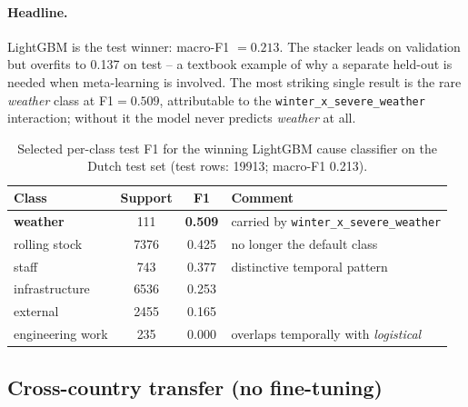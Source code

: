 \paragraph{Headline.} LightGBM is the test winner: macro-F1 $=\num{0.213}$. The stacker leads on validation but overfits to \num{0.137} on test -- a textbook example of why a separate held-out is needed when meta-learning is involved. The most striking single result is the rare \emph{weather} class at F1$=\num{0.509}$, attributable to the \texttt{winter\_x\_severe\_weather} interaction; without it the model never predicts \emph{weather} at all.

\begin{table}[H]
    \centering
    \caption{Selected per-class test F1 for the winning LightGBM cause classifier on the Dutch test set (test rows: \num{19913}; macro-F1 \num{0.213}).}
    \label{tab:cause}
    \footnotesize
    \begin{tabular}{l S[table-format=4.0,group-separator={,}] S[table-format=1.3] l}
        \toprule
        Class & {Support} & {F1} & Comment \\
        \midrule
        \textbf{weather}  &  111 & {\bfseries 0.509} & carried by \texttt{winter\_x\_severe\_weather} \\
        rolling stock     & 7376 & 0.425 & no longer the default class \\
        staff             &  743 & 0.377 & distinctive temporal pattern \\
        infrastructure    & 6536 & 0.253 & \\
        external          & 2455 & 0.165 & \\
        engineering work  &  235 & 0.000 & overlaps temporally with \emph{logistical} \\
        \bottomrule
    \end{tabular}
\end{table}

\subsection{Cross-country transfer (no fine-tuning)}

